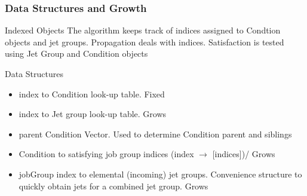 \documentclass{beamer}
\begin{document}
 \frame
{
\frametitle{Data Structures and Growth}
\begin{block}{Indexed Objects}
The algorithm keeps track of indices assigned to Condtion objects and jet groups. Propagation deals with indices. Satisfaction
is tested using Jet Group and Condition objects 
\end{block}

\begin{block}{Data Structures}
\begin{itemize}
\item index to Condition look-up table. Fixed
\item index to Jet group look-up table. \alert{Grows}
\item parent Condition Vector. Used to determine Condition parent and siblings
\item Condition to satisfying job group indices (index $\rightarrow$ [indices])/ \alert{Grows}
\item jobGroup index to elemental (incoming) jet groups. Convenience structure to quickly obtain jets for a combined jet group. \alert{Grows}
\end{itemize}

\end{block}

}
\end{document}

